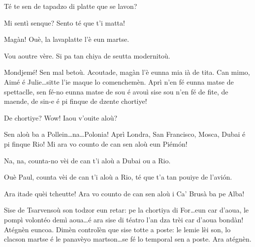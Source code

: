 \begin{drama}
\Maganspeaks{} Té te sen de tapadzo di platte que se lavon?

\Paganspeaks Mi sentì senque? Sento té que t'i matta!

\Nevaousaspeaks Magàn! Ouè, la lavaplatte l'è eun martse.

\Maganspeaks Vou aoutre vère. Si pa tan chiya de seutta modernitoù.


\Paganspeaks Mondjemé! Sen mal betoù.  Acoutade, magàn l'è eunna mia ià de tita. Can mimo, Aimé é Julie\ldots sitte l'ie maque lo comenchemèn. Aprì n'en fé eunna matse de spettaclle, sen fé-no eunna matse de sou é avouì sise sou n'en fé de fite, de maende, de sin-e é pi finque de dzente chortiye!

\Nevaousaspeaks De chortiye? Wow! Iaou v'ouite aloù?

\Paganspeaks Sen aloù ba a Pollein\ldots na\ldots Polonia! Aprì Londra, San Francisco,  Mosca, Dubai é pi finque Rio! Mi ara vo counto de can sen aloù eun Piém\'on!

\Nevaouspeaks Na, na, counta-no vèi de can t'i aloù a Dubai ou a Rio.

 
\Maganspeaks Ouè Paul, counta vèi de can t'i aloù a Rio, té que t'a tan pouiye de l’avi\'on.

\Paganspeaks{} Ara itade quèi tcheutte! Ara vo counto de can sen aloù i Ca' Brusà ba pe Alba! 






\Chauffeurspeaks Sise de Tsarvensoù son todzor eun retar: pe la chortiya di For\ldots eun car d'aoua, le pompì volontéo demì aoua\ldots é ara sise di téatro l'an dza trèi car d'aoua bondàn! Atégnèn euncoa. Dimèn controlèn que sise totte a poste: le lemie lèi son, lo clacson martse é le panavèyo martson\ldots se fé lo temporal sen a poste. Ara atégnèn.


\end{drama}
